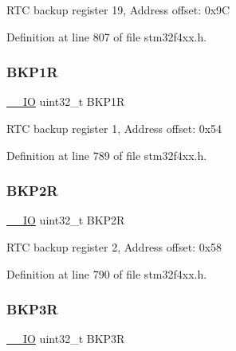 R\+TC backup register 19, Address offset\+: 0x9C 

Definition at line 807 of file stm32f4xx.\+h.

\mbox{\label{struct_r_t_c___type_def_af85290529fb82acef7c9fcea3718346c}} 
\subsubsection{\texorpdfstring{B\+K\+P1R}{BKP1R}}
{\footnotesize\ttfamily \hyperlink{group___c_m_s_i_s__core__definitions_gaec43007d9998a0a0e01faede4133d6be}{\+\_\+\+\_\+\+IO} uint32\+\_\+t B\+K\+P1R}

R\+TC backup register 1, Address offset\+: 0x54 

Definition at line 789 of file stm32f4xx.\+h.

\mbox{\label{struct_r_t_c___type_def_aaa251a80daa57ad0bd7db75cb3b9cdec}} 
\subsubsection{\texorpdfstring{B\+K\+P2R}{BKP2R}}
{\footnotesize\ttfamily \hyperlink{group___c_m_s_i_s__core__definitions_gaec43007d9998a0a0e01faede4133d6be}{\+\_\+\+\_\+\+IO} uint32\+\_\+t B\+K\+P2R}

R\+TC backup register 2, Address offset\+: 0x58 

Definition at line 790 of file stm32f4xx.\+h.

\mbox{\label{struct_r_t_c___type_def_a0b1eeda834c3cfd4d2c67f242f7b2a1c}} 
\subsubsection{\texorpdfstring{B\+K\+P3R}{BKP3R}}
{\footnotesize\ttfamily \hyperlink{group___c_m_s_i_s__core__definitions_gaec43007d9998a0a0e01faede4133d6be}{\+\_\+\+\_\+\+IO} uint32\+\_\+t B\+K\+P3R}

